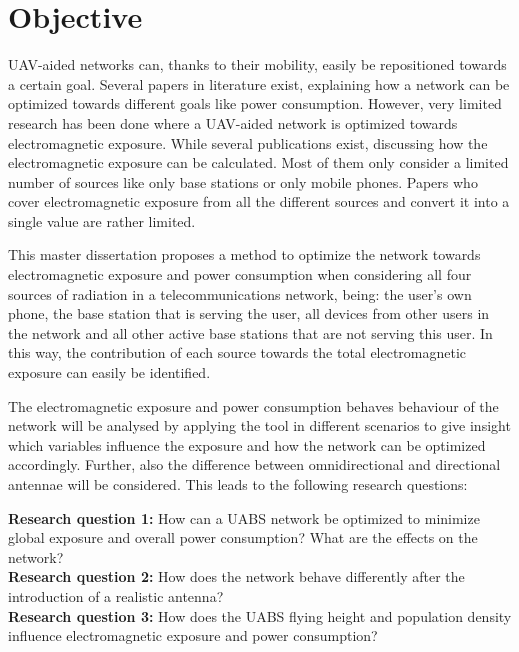 \section{Objective}
\label{sec:objective}

\gls{UAV}-aided networks can, thanks to their mobility, easily be repositioned towards a certain goal. Several papers 
in literature exist, explaining how a network can be optimized towards different goals like power consumption.
However, very limited
research has been done where a \gls{UAV}-aided network is optimized towards  electromagnetic exposure.
While several publications exist, discussing how the electromagnetic exposure can be calculated. 
Most of them only consider a limited number of sources like only base stations or only mobile phones.
Papers who cover electromagnetic exposure from all the different sources and convert it into a single value are rather limited.

This master dissertation proposes a method to optimize the network towards electromagnetic exposure and power consumption
when considering all four sources of radiation in a telecommunications network, being: the user's own phone,
 the base station that is serving the user, 
all devices from other users in the network and all 
other active base stations that are not serving this user. In this way, the contribution of each source towards the total 
electromagnetic exposure can easily be identified. 

The electromagnetic exposure and power consumption behaves  behaviour of the network will be analysed by applying the tool in different scenarios 
to give insight which variables influence the exposure and how
the network can be optimized accordingly. Further, also the difference between omnidirectional and directional antennae will 
be considered. This leads to the following research questions:

\textbf{Research question 1:} How can a \gls{UABS} network be optimized to minimize global exposure and overall power consumption? 
What are the effects on the network?\\

\textbf{Research question 2:} How does the network behave differently after the introduction of a realistic antenna?\\

\textbf{Research question 3:} How does the \gls{UABS} flying height and population density influence electromagnetic 
exposure and power consumption?\\

